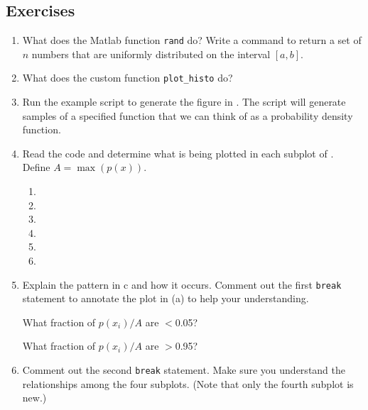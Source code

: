 \documentclass[11pt,titlepage,fleqn]{article}
\newcommand{\vertgap}{\vspace{1cm}}
\begin{document}




\pagebreak
\subsection*{Exercises}

\begin{enumerate}
\item What does the Matlab function \verb+rand+ do? Write a command to return a set of $n$ numbers that are uniformly distributed on the interval $[a,b]$.

\vertgap

\item What does the custom function \verb+plot_histo+ do?

\vertgap

\item Run the example script to generate the figure in . The script will generate samples of a specified function that we can think of as a probability density function.

\item Read the code and determine what is being plotted in each subplot of . \\
Define $A = \max(p(x))$.
%
\begin{spacing}{2.0}
\begin{enumerate}
\item 
\item 
\item 
\item 
\item 
\item 
\end{enumerate}
\end{spacing}

\item Explain the pattern in c and how it occurs. Comment out the first \verb+break+ statement to annotate the plot in (a) to help your understanding.

What fraction of $p(x_i)/A$ are $<$0.05?

What fraction of $p(x_i)/A$ are $>$0.95?

\vertgap

\item Comment out the second \verb+break+ statement. Make sure you understand the relationships among the four subplots. (Note that only the fourth subplot is new.)


\end{enumerate}
\end{document}

